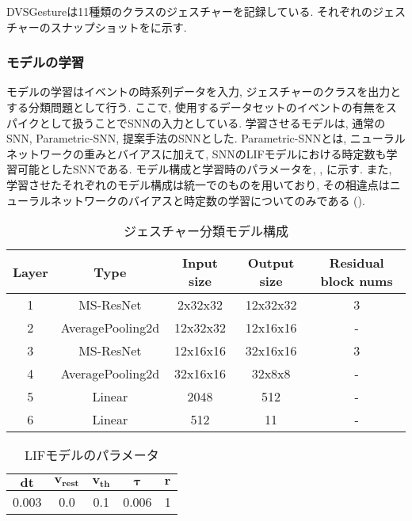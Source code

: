 DVSGestureは11種類のクラスのジェスチャーを記録している.
それぞれのジェスチャーのスナップショットをに示す.


\subsubsection{モデルの学習}
モデルの学習はイベントの時系列データを入力, ジェスチャーのクラスを出力とする分類問題として行う.
ここで, 使用するデータセットのイベントの有無をスパイクとして扱うことでSNNの入力としている.
学習させるモデルは, 通常のSNN, Parametric-SNN, 提案手法のSNNとした.
Parametric-SNNとは, ニューラルネットワークの重みとバイアスに加えて, SNNのLIFモデルにおける時定数も学習可能としたSNNである.
モデル構成と学習時のパラメータを, , に示す.
また, 学習させたそれぞれのモデル構成は統一でのものを用いており, その相違点はニューラルネットワークのバイアスと時定数の学習についてのみである ().
\begin{table}[htb]
    \centering
    \caption{ジェスチャー分類モデル構成}
    \label{tab:exp2:model}
    \begin{tabular}{ccccc}
        \hline
        \textbf{Layer}& \textbf{Type}&\textbf{Input size} & \textbf{Output size} & \textbf{Residual block nums}\\
        \hline
        1   & MS-ResNet & 2x32x32 & 12x32x32 & 3\\
        2 & AveragePooling2d & 12x32x32 & 12x16x16 & - \\
        3 & MS-ResNet & 12x16x16 & 32x16x16 & 3\\
        4 & AveragePooling2d & 32x16x16 & 32x8x8 & - \\
        5 & Linear & 2048 & 512 & - \\
        6 & Linear & 512 & 11 & - \\
        \hline
    \end{tabular}
\end{table}

\begin{table}[htb]
    \centering
    \caption{LIFモデルのパラメータ}
    \label{tab:exp2:model:parameter:lif}
    \begin{tabular}{ccccc}
        \hline
        $\bm{dt}$& $\bm{v_{rest}}$ & $\bm{v_{th}}$ & $\bm{\tau}$ & $\bm{r}$\\
        \hline
        0.003   & 0.0 & 0.1 & 0.006 & 1 \\
        \hline
    \end{tabular}
\end{table}


